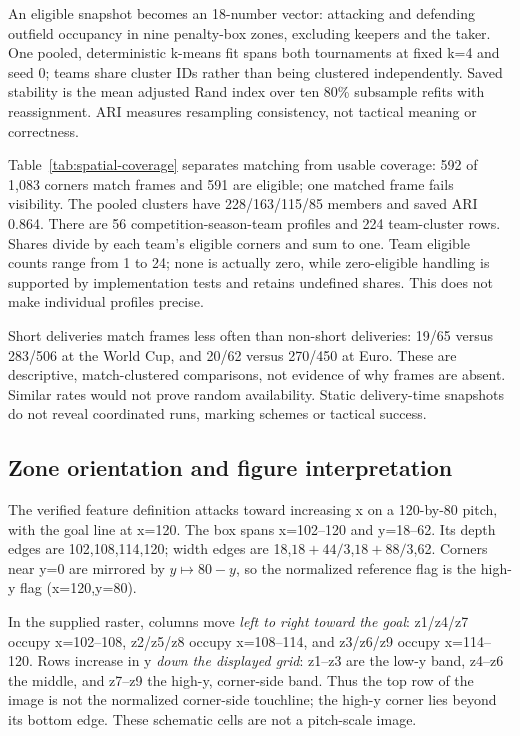 \documentclass[sigconf,nonacm]{acmart}
\begin{document}
An eligible snapshot becomes an 18-number vector: attacking and defending outfield
occupancy in nine penalty-box zones, excluding keepers and the taker. One pooled,
deterministic k-means fit spans both tournaments at fixed k=4 and seed 0; teams
share cluster IDs rather than being clustered independently. Saved stability is
the mean adjusted Rand index over ten 80\% subsample refits with reassignment.
ARI measures resampling consistency, not tactical meaning or correctness.

Table~\ref{tab:spatial-coverage} separates matching from usable coverage: 592 of
1,083 corners match frames and 591 are eligible; one matched frame fails visibility.
The pooled clusters have 228/\allowbreak{}163/\allowbreak{}115/\allowbreak{}85 members and saved ARI 0.864. There are 56
competition-season-team profiles and 224 team-cluster rows. Shares divide by each
team's eligible corners and sum to one. Team eligible counts range from 1 to 24;
none is actually zero, while zero-eligible handling is supported by implementation
tests and retains undefined shares. This does not make individual profiles precise.


Short deliveries match frames less often than non-short deliveries: 19/\allowbreak{}65 versus
283/\allowbreak{}506 at the World Cup, and 20/\allowbreak{}62 versus 270/\allowbreak{}450 at Euro. These are descriptive,
match-clustered comparisons, not evidence of why frames are absent. Similar rates
would not prove random availability. Static delivery-time snapshots do not reveal
coordinated runs, marking schemes or tactical success.

\subsection{Zone orientation and figure interpretation}
The verified feature definition attacks toward increasing x on a 120-by-80 pitch,
with the goal line at x=120. The box spans x=102--120 and y=18--62. Its depth edges
are 102,108,114,120; width edges are 18,$18+44/\allowbreak{}3$,$18+88/\allowbreak{}3$,62. Corners near y=0
are mirrored by $y\mapsto80-y$, so the normalized reference flag is the high-y flag
(x=120,y=80).

In the supplied raster, columns move \emph{left to right toward the goal}:
z1/z4/z7 occupy x=102--108, z2/z5/z8 occupy x=108--114, and z3/z6/z9 occupy
x=114--120. Rows increase in y \emph{down the displayed grid}: z1--z3 are the low-y
band, z4--z6 the middle, and z7--z9 the high-y, corner-side band. Thus the top row
of the image is not the normalized corner-side touchline; the high-y corner lies
beyond its bottom edge. These schematic cells are not a pitch-scale image.
\end{document}
